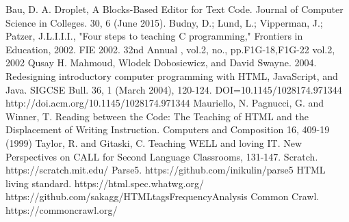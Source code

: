 \documentclass[conference]{IEEEtran}
\begin{document}
\begin{thebibliography}{1}

  Bau, D. A. Droplet, A Blocks-Based Editor for Text Code. Journal of Computer Science in Colleges. 30, 6 (June 2015).
  Budny, D.; Lund, L.; Vipperman, J.; Patzer, J.L.I.I.I., "Four steps to teaching C programming," Frontiers in Education, 2002. FIE 2002. 32nd Annual , vol.2, no., pp.F1G-18,F1G-22 vol.2, 2002
  Qusay H. Mahmoud, Wlodek Dobosiewicz, and David Swayne. 2004. Redesigning introductory computer programming with HTML, JavaScript, and Java. SIGCSE Bull. 36, 1 (March 2004), 120-124. DOI=10.1145/1028174.971344 http://doi.acm.org/10.1145/1028174.971344
  Mauriello, N. Pagnucci, G. and Winner, T. Reading between the Code: The Teaching of HTML and the Displacement of Writing Instruction. Computers and Composition 16, 409-19 (1999)
  Taylor, R. and Gitaski, C. Teaching WELL and loving IT. New Perspectives on CALL for Second Language Classrooms, 131-147.
  Scratch. https://scratch.mit.edu/
  Parse5. https://github.com/inikulin/parse5
  HTML living standard. https://html.spec.whatwg.org/
  https://github.com/sakagg/HTMLtagsFrequencyAnalysis
  Common Crawl. https://commoncrawl.org/

\end{thebibliography}

\end{document}

